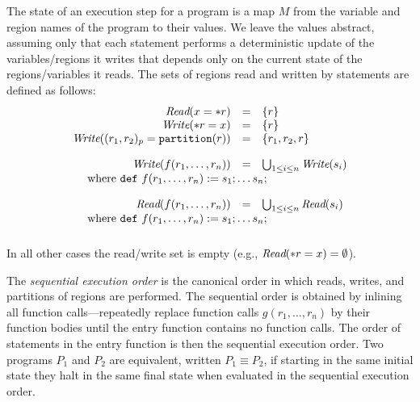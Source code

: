 The state of an execution step for a program is a map $M$ from the
variable and region names of the program to their values.  We leave the values
abstract, assuming only that each statement performs a deterministic
update of the variables/regions it writes that depends only on the
current state of the regions/variables it reads.
The sets of regions read and written by statements are defined as follows:
\[
\begin{array}{rcl}
\rread{x = \deref r} & = & \{ r \} \\
\rwrite{\deref r = x} & = & \{ r \} \\
\rwrite{(r_1, r_2)_{p} = \mbox{\tt partition}(r)} & = & \{ r_1,r_2,r \} \\[.15in]
\rwrite{f(r_1,\ldots,r_n)} & = & \bigcup_{1 \leq i \leq n}{\rwrite{s_i}} \\
\multicolumn{3}{l}{\ \ \ \ \mbox{where\ {\tt def}}\ f(r_1,\ldots,r_n): =   s_1; \ldots s_n;} \\[.15in]
\rread{f(r_1,\ldots,r_n)} & = & \bigcup_{1 \leq i \leq n}{\rread{s_i}} \\
\multicolumn{3}{l}{\ \ \ \ \mbox{where\ {\tt def}}\ f(r_1,\ldots,r_n): =   s_1; \ldots s_n;} \\[.15in]
\end{array}
\]
In all other cases the read/write set is empty (e.g., $\mbox{\em Read}(\ast r = x) = \emptyset$).

The {\em sequential execution order} is the canonical order in which reads, writes, and partitions of regions are performed.
The sequential order is obtained by inlining all function calls---repeatedly
replace function calls $g(r_1,\ldots,r_n)$ by their function bodies until the entry function contains no function calls.
The order of statements in the entry function is then the sequential execution order. 
Two programs $P_1$ and $P_2$ are equivalent, written $P_1 \equiv P_2$, if starting in the same initial state they halt in
the same final state when evaluated in the sequential execution order.

